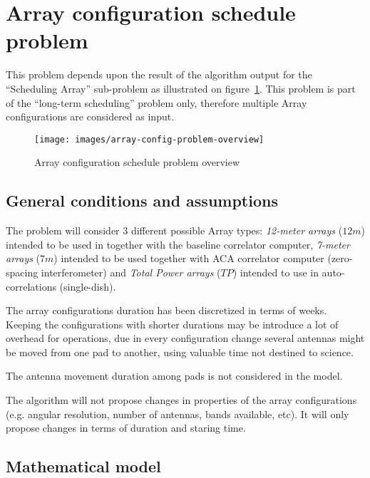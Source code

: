 \section{Array configuration schedule problem}
This problem depends upon the result of the algorithm output for the ``Scheduling Array'' sub-problem as illustrated on figure~\ref{fig:array-config-problem-overview}. This problem is part of the ``long-term scheduling'' problem only, therefore multiple Array configurations are considered as input.
\begin{figure}[h!]
\begin{center}
\texttt{[image: images/array-config-problem-overview]}
\caption{Array configuration schedule problem overview}
\end{center}
\label{fig:array-config-problem-overview}
\end{figure}

\subsection{General conditions and assumptions}
\label{sec:array-problem-general-condition}
The problem will consider 3 different possible Array types: \textit{12-meter arrays} ($12m$) intended to be used in together with the baseline correlator computer, \textit{7-meter arrays} ($7m$) intended to be used together with ACA correlator computer (zero-spacing interferometer) and \textit{Total Power arrays} ($TP$) intended to use in auto-correlations (single-dish). 

The array configurations duration has been discretized in terms of weeks. Keeping the configurations with shorter durations may be introduce a lot of overhead for operations, due in every configuration change several antennas might be moved from one pad to another, using valuable time not destined to science.

The antenna movement duration among pads is not considered in the model.

The algorithm will not propose changes in properties of the array configurations (e.g. angular resolution, number of antennas, bands available, etc). It will only propose changes in terms of duration and staring time.

\subsection{Mathematical model}

